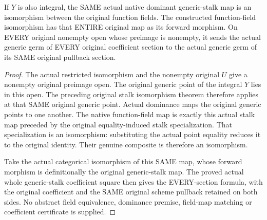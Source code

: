 \begin{theorem}
\label{sc0-generic-open-field:whole-original-fields}
\leanok
If $Y$ is also integral, the SAME actual native dominant generic-stalk
map is an isomorphism between the original function fields. The
constructed function-field isomorphism has that ENTIRE original map
as its forward morphism. On EVERY original nonempty open whose
preimage is nonempty, it sends the actual generic germ of EVERY
original coefficient section to the actual generic germ of its SAME
original pullback section.
\end{theorem}
\begin{proof}
The actual restricted isomorphism and the nonempty original $U$
give a nonempty original preimage open. The original generic point
of the integral $Y$ lies in this open. The preceding original stalk
isomorphism theorem therefore applies at that SAME original generic
point. Actual dominance maps the original generic points to one
another. The native function-field map is exactly this actual stalk
map preceded by the original equality-induced stalk specialization.
That specialization is an isomorphism: substituting the actual point
equality reduces it to the original identity. Their genuine composite
is therefore an isomorphism.

Take the actual categorical isomorphism of this SAME map, whose
forward morphism is definitionally the original generic-stalk map.
The proved actual whole generic-stalk coefficient square
then gives the EVERY-section formula, with the original coefficient
and the SAME original scheme pullback retained on both sides. No
abstract field equivalence, dominance premise, field-map matching
or coefficient certificate is supplied.
\end{proof}

